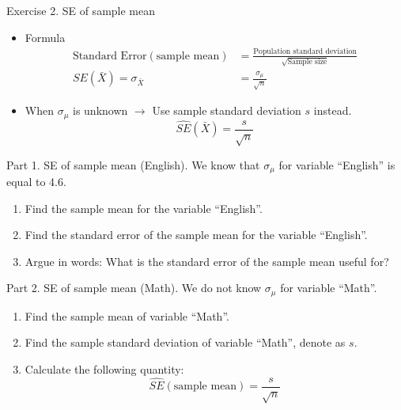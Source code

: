 \documentclass[
  10pt,
  ignorenonframetext,
]{beamer}
\providecommand{\tightlist}{%
  \setlength{\itemsep}{0pt}\setlength{\parskip}{0pt}}
\begin{document}
\begin{frame}{Exercise 2. SE of sample mean}
\protect\hypertarget{exercise-2.-se-of-sample-mean-1}{}
\begin{itemize}
\tightlist
\item
  Formula \[
  \begin{aligned}
  \text{Standard Error}(\text{sample mean}) &=\frac{\text{Population standard deviation}}{\sqrt{\text{Sample size}}}\\
  SE(\bar{X}) = \sigma_{\bar{X}} &= \frac{\sigma_\mu}{\sqrt{n}}
  \end{aligned}
  \]
\end{itemize}

\vspace{3mm}

\begin{itemize}
\tightlist
\item
  When \(\sigma_\mu\) is unknown \(\rightarrow\) Use sample standard
  deviation \(s\) instead. \[
  \widehat{SE}(\bar{X}) = \frac{s}{\sqrt{n}}
  \]
\end{itemize}
\end{frame}

\begin{frame}{Part 1. SE of sample mean (English).}
\protect\hypertarget{part-1.-se-of-sample-mean-english.}{}
We know that \(\sigma_\mu\) for variable ``English'' is equal to 4.6.

\begin{enumerate}
\tightlist
\item
  Find the sample mean for the variable ``English''.
\item
  Find the standard error of the sample mean for the variable
  ``English''.
\item
  Argue in words: What is the standard error of the sample mean useful
  for?
\end{enumerate}
\end{frame}

\begin{frame}{Part 2. SE of sample mean (Math).}
\protect\hypertarget{part-2.-se-of-sample-mean-math.}{}
We do not know \(\sigma_\mu\) for variable ``Math''.

\begin{enumerate}
\tightlist
\item
  Find the sample mean of variable ``Math''.
\item
  Find the sample standard deviation of variable ``Math'', denote as
  \(s\).
\item
  Calculate the following quantity: \[
  \widehat{SE}(\text{sample mean}) = \frac{s}{\sqrt{n}}
  \]
\end{enumerate}
\end{frame}
\end{document}
